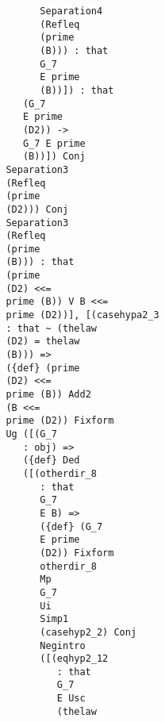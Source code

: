 \documentclass[12pt]{article}
\begin{document}
\begin{verbatim}
                                        Separation4 
                                        (Refleq 
                                        (prime 
                                        (B))) : that 
                                        G_7 
                                        E prime 
                                        (B))]) : that 
                                     (G_7 
                                     E prime 
                                     (D2)) -> 
                                     G_7 E prime 
                                     (B))]) Conj 
                                  Separation3 
                                  (Refleq 
                                  (prime 
                                  (D2))) Conj 
                                  Separation3 
                                  (Refleq 
                                  (prime 
                                  (B))) : that 
                                  (prime 
                                  (D2) <<= 
                                  prime (B)) V B <<= 
                                  prime (D2))], [(casehypa2_3 
                                  : that ~ (thelaw 
                                  (D2) = thelaw 
                                  (B))) => 
                                  ({def} (prime 
                                  (D2) <<= 
                                  prime (B)) Add2 
                                  (B <<= 
                                  prime (D2)) Fixform 
                                  Ug ([(G_7 
                                     : obj) => 
                                     ({def} Ded 
                                     ([(otherdir_8 
                                        : that 
                                        G_7 
                                        E B) => 
                                        ({def} (G_7 
                                        E prime 
                                        (D2)) Fixform 
                                        otherdir_8 
                                        Mp 
                                        G_7 
                                        Ui 
                                        Simp1 
                                        (casehyp2_2) Conj 
                                        Negintro 
                                        ([(eqhyp2_12 
                                           : that 
                                           G_7 
                                           E Usc 
                                           (thelaw 

\end{verbatim}
\end{document}
